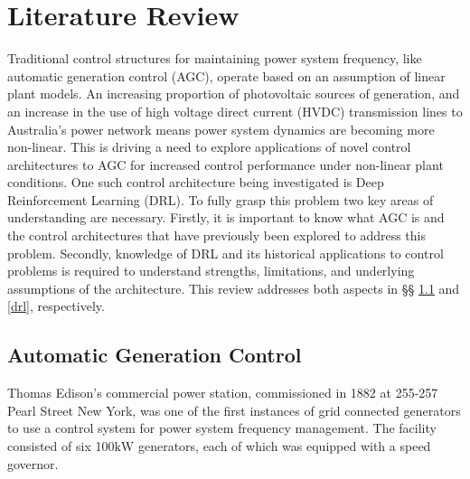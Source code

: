\section{Literature Review}

Traditional control structures for maintaining power system frequency, like automatic generation control (AGC), operate based on an assumption of linear plant models. An increasing proportion of photovoltaic sources of generation, and an increase in the use of high voltage direct current (HVDC) transmission lines to Australia's power network means power system dynamics are becoming more non-linear. This is driving a need to explore applications of novel control architectures to AGC for increased control performance under non-linear plant conditions. One such control architecture being investigated is Deep Reinforcement Learning (DRL). To fully grasp this problem two key areas of understanding are necessary. Firstly, it is important to know what AGC is and the control architectures that have previously been explored to address this problem. Secondly, knowledge of DRL and its historical applications to control problems is required to understand strengths, limitations, and underlying assumptions of the architecture. This review addresses both aspects in \S{}\S{} \ref{agc} and \ref{drl}, respectively.


\subsection{Automatic Generation Control}\label{agc}

Thomas Edison's commercial power station, commissioned in 1882 at 255-257 Pearl Street New York, was one of the first instances of grid connected generators to use a control system for power system frequency management. The facility consisted of six 100$\si{\kilo\watt}$ generators, each of which was equipped with a speed governor.



